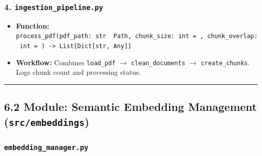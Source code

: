 \documentclass[
]{article}
\providecommand{\tightlist}{%
  \setlength{\itemsep}{0pt}\setlength{\parskip}{0pt}}
\begin{document}
\subsubsection{\texorpdfstring{4.
\texttt{ingestion\_\allowbreak pipeline.\allowbreak py}}{4. ingestion\_pipeline.py}}\label{ingestion_pipeline.py}

\begin{itemize}
\tightlist
\item
  \textbf{Function:}
  \texttt{process\_\allowbreak pdf(\allowbreak pdf\_\allowbreak path:\ \allowbreak str\ \allowbreak \textbar{}\ \allowbreak Path,\allowbreak \ \allowbreak chunk\_\allowbreak size:\ \allowbreak int\ \allowbreak =\allowbreak \ ,\allowbreak \ \allowbreak chunk\_\allowbreak overlap:\ \allowbreak int\ \allowbreak =\allowbreak \ )\allowbreak \ \allowbreak -\textgreater{}\allowbreak \ \allowbreak List{[}Dict{[}str,\allowbreak \ \allowbreak Any{]}{]}}
\item
  \textbf{Workflow:} Combines \texttt{load\_\allowbreak pdf} \(\rightarrow\)
  \texttt{clean\_\allowbreak documents} \(\rightarrow\) \texttt{create\_\allowbreak chunks}.
  Logs chunk count and processing status.
\end{itemize}

\begin{center}\rule{0.5\linewidth}{0.5pt}\end{center}

\subsection{\texorpdfstring{6.2 Module: Semantic Embedding Management
(\texttt{src/\allowbreak embeddings})}{6.2 Module: Semantic Embedding Management (src/embeddings)}}\label{module-semantic-embedding-management-srcembeddings}

\subsubsection{\texorpdfstring{\texttt{embedding\_\allowbreak manager.\allowbreak py}}{embedding\_manager.py}}\label{embedding_manager.py}
\end{document}
